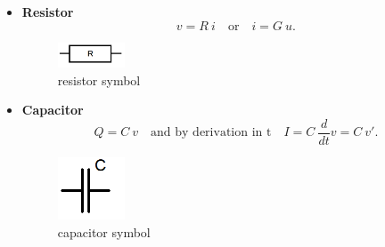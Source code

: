 	\begin{frame}
		\begin{itemize}
			\item \textbf{Resistor} \newline
			\begin{equation}
				\label{eq:resistor law}
				v = R \ i \quad \text{or} \quad i = G \ u.
			\end{equation}
			\begin{figure}[H]
				\label{fig:resistor symbol}
				\centering
				\includegraphics[width=2cm]{../Tex/pictures/resistor.png}
				\caption{resistor symbol}
			\end{figure}
			
			\item \textbf{Capacitor} \newline
			\begin{equation}
				\label{eq:capacitor law}
				Q = C \ v \quad \text{and by derivation in t} \quad I = C \ \frac{d}{dt}v = C \ v'.
			\end{equation}
			\begin{figure}[H]
				\label{fig:capacitor symbol}
				\centering
				\includegraphics[width=2cm]{../Tex/pictures/capacitor.png}
				\caption{capacitor symbol}
			\end{figure}
		\end{itemize}
	\end{frame}
			
